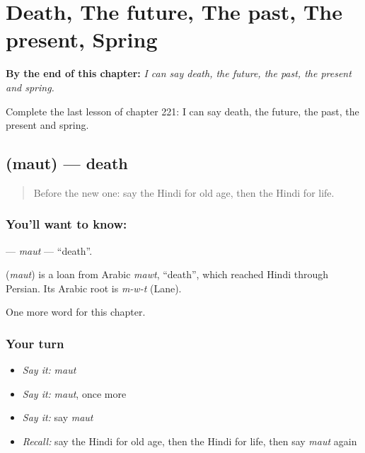 
\chapter{Death, The future, The past, The present, Spring}
\label{ch:hi-death-the-future-the-past-the-present-spring}

\begin{chapteropening}
\textbf{By the end of this chapter:} \emph{I can say death, the future, the past, the present and spring.}

Complete the last lesson of chapter 221: I can say death, the future, the past, the present and spring.
\end{chapteropening}

\section[\texorpdfstring{\hi{मौत} (maut)}{मौत (maut)}]{ (maut) — death}

\label{lesson:HI-C221-maut}



\begin{quote}
Before the new one: say the Hindi for old age, then the Hindi for life.
\end{quote}

\subsection*{You'll want to know: }
\textbf{} — \emph{maut} — \textquotedblleft{}death\textquotedblright{}.

\begin{cousinweb}
\textbf{} (\emph{maut}) is a loan from Arabic \emph{mawt}, \textquotedblleft{}death\textquotedblright{}, which reached Hindi through Persian. Its Arabic root is \emph{m-w-t} (Lane).
\end{cousinweb}

\begin{grammarlens}[title={What you've built}]
One more word for this chapter.
\end{grammarlens}

\subsection*{Your turn}
\begin{itemize}
\raggedright
  \item \emph{Say it:} \emph{maut}
  \item \emph{Say it:} \emph{maut}, once more
  \item \emph{Say it:} say \emph{maut}
  \item \emph{Recall:} say the Hindi for old age, then the Hindi for life, then say \emph{maut} again
\end{itemize}

